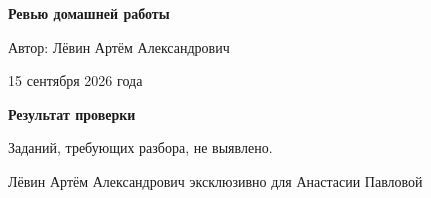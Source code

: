 \documentclass[12pt,a4paper]{article}
\begin{document}

\begin{titlepage}
\centering
\vspace*{0.24\textheight}

{\LARGE\bfseries Ревью домашней работы\par}
\vspace{18mm}
{\large Автор: Лёвин Артём Александрович\par}
\vspace{7mm}
{\large 15 сентября 2026 года\par}

\vfill
{}
\vspace*{8mm}
\end{titlepage}

\newpage
\thispagestyle{empty}
\vspace*{0.34\textheight}
\begin{center}
{\Large\bfseries Результат проверки}\par
\vspace{12mm}
{\large Заданий, требующих разбора, не выявлено.}
\end{center}

\vfill
\begin{center}
\small Лёвин Артём Александрович эксклюзивно для Анастасии Павловой
\end{center}
\end{document}
